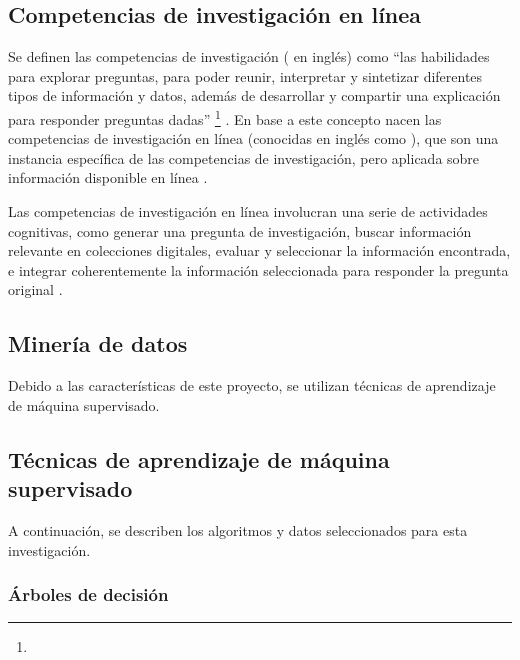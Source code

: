 \subsection{Competencias de investigación en línea}
\label{subsec:competencias}
Se definen las competencias de investigación ( en inglés) como “las habilidades para explorar preguntas, para poder reunir, interpretar y sintetizar diferentes tipos de información y datos, además de desarrollar y compartir una explicación para responder preguntas dadas” \footnote{\traduccionlibre} \parencite[p.~13]{national2000inquiry}. En base a este concepto nacen las competencias de investigación en línea (conocidas en inglés como ), que son una instancia específica de las competencias de investigación, pero aplicada sobre información disponible en línea \parencite{quintana2005framework}.

Las competencias de investigación en línea involucran una serie de actividades cognitivas, como generar una pregunta de investigación, buscar información relevante en colecciones digitales, evaluar y seleccionar la información encontrada, e integrar coherentemente la información seleccionada para responder la pregunta original \parencite{eisenberg1990information}.

\subsection{Minería de datos}


Debido a las características de este proyecto, se utilizan técnicas de aprendizaje de máquina supervisado.

\subsection{Técnicas de aprendizaje de máquina supervisado}
\label{subsec:tecnicas-mineria}
A continuación, se describen los algoritmos y datos seleccionados para esta investigación.

\subsubsection*{Árboles de decisión}

\begin{figure}[H]
	\centering
	
	\label{fig:decision-tree}
\end{figure}


